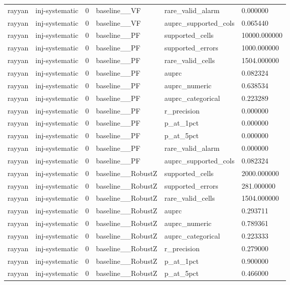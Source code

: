 \begin{tabular}{llllll}
rayyan & inj-systematic & 0 & baseline\_\_VF & rare\_valid\_alarm & 0.000000 \\
rayyan & inj-systematic & 0 & baseline\_\_VF & auprc\_supported\_cols & 0.065440 \\
rayyan & inj-systematic & 0 & baseline\_\_PF & supported\_cells & 10000.000000 \\
rayyan & inj-systematic & 0 & baseline\_\_PF & supported\_errors & 1000.000000 \\
rayyan & inj-systematic & 0 & baseline\_\_PF & rare\_valid\_cells & 1504.000000 \\
rayyan & inj-systematic & 0 & baseline\_\_PF & auprc & 0.082324 \\
rayyan & inj-systematic & 0 & baseline\_\_PF & auprc\_numeric & 0.638534 \\
rayyan & inj-systematic & 0 & baseline\_\_PF & auprc\_categorical & 0.223289 \\
rayyan & inj-systematic & 0 & baseline\_\_PF & r\_precision & 0.000000 \\
rayyan & inj-systematic & 0 & baseline\_\_PF & p\_at\_1pct & 0.000000 \\
rayyan & inj-systematic & 0 & baseline\_\_PF & p\_at\_5pct & 0.000000 \\
rayyan & inj-systematic & 0 & baseline\_\_PF & rare\_valid\_alarm & 0.000000 \\
rayyan & inj-systematic & 0 & baseline\_\_PF & auprc\_supported\_cols & 0.082324 \\
rayyan & inj-systematic & 0 & baseline\_\_RobustZ & supported\_cells & 2000.000000 \\
rayyan & inj-systematic & 0 & baseline\_\_RobustZ & supported\_errors & 281.000000 \\
rayyan & inj-systematic & 0 & baseline\_\_RobustZ & rare\_valid\_cells & 1504.000000 \\
rayyan & inj-systematic & 0 & baseline\_\_RobustZ & auprc & 0.293711 \\
rayyan & inj-systematic & 0 & baseline\_\_RobustZ & auprc\_numeric & 0.789361 \\
rayyan & inj-systematic & 0 & baseline\_\_RobustZ & auprc\_categorical & 0.223333 \\
rayyan & inj-systematic & 0 & baseline\_\_RobustZ & r\_precision & 0.279000 \\
rayyan & inj-systematic & 0 & baseline\_\_RobustZ & p\_at\_1pct & 0.900000 \\
rayyan & inj-systematic & 0 & baseline\_\_RobustZ & p\_at\_5pct & 0.466000 \\

\end{tabular}
